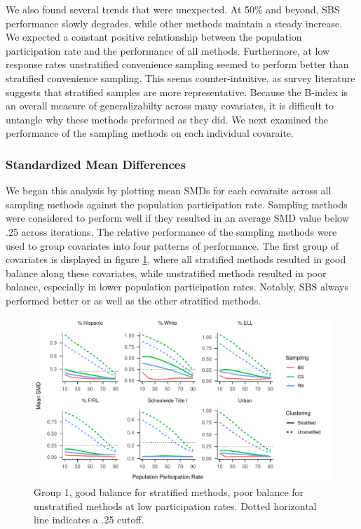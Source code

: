 \documentclass[man,floatsintext]{apa6}
\begin{document}
We also found several trends that were unexpected. At 50\% and beyond, SBS performance slowly degrades, while other methods maintain a steady increase. We expected a constant positive relationship between the population participation rate and the performance of all methods. Furthermore, at low response rates unstratified convenience sampling seemed to perform better than stratified convenience sampling. This seems counter-intuitive, as survey literature suggests that stratified samples are more representative. Because the B-index is an overall measure of generalizabilty across many covariates, it is difficult to untangle why these methods preformed as they did. We next examined the performance of the sampling methods on each individual covaraite.

\hypertarget{standardized-mean-differences}{%
\subsubsection{Standardized Mean Differences}\label{standardized-mean-differences}}

We began this analysis by plotting mean SMDs for each covaraite across all sampling methods against the population participation rate. Sampling methods were considered to perform well if they resulted in an average SMD value below .25 across iterations. The relative performance of the sampling methods were used to group covariates into four patterns of performance. The first group of covariates is displayed in figure \ref{fig:fig-SMD-by-Var-good1}, where all stratified methods resulted in good balance along these covariates, while unstratified methods resulted in poor balance, especially in lower population participation rates. Notably, SBS always performed better or as well as the other stratified methods.

\begin{figure}
\centering
\includegraphics{GenSamp-Paper_files/figure-latex/fig-SMD-by-Var-good1-1.pdf}
\caption{\label{fig:fig-SMD-by-Var-good1}Group 1, good balance for stratified methods, poor balance for unstratified methods at low participation rates. Dotted horizontal line indicates a .25 cutoff.}
\end{figure}
\end{document}
